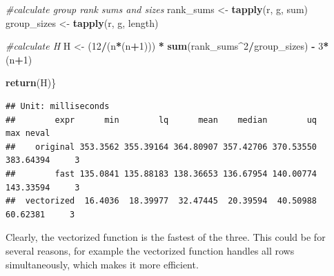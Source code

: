 \documentclass[
]{article}
\newenvironment{Shaded}{\begin{snugshade}}{\end{snugshade}}
\newcommand{\AttributeTok}[1]{\textcolor[rgb]{0.13,0.29,0.53}{#1}}
\newcommand{\CommentTok}[1]{\textcolor[rgb]{0.56,0.35,0.01}{\textit{#1}}}
\newcommand{\ControlFlowTok}[1]{\textcolor[rgb]{0.13,0.29,0.53}{\textbf{#1}}}
\newcommand{\DecValTok}[1]{\textcolor[rgb]{0.00,0.00,0.81}{#1}}
\newcommand{\FunctionTok}[1]{\textcolor[rgb]{0.13,0.29,0.53}{\textbf{#1}}}
\newcommand{\NormalTok}[1]{#1}
\newcommand{\OtherTok}[1]{\textcolor[rgb]{0.56,0.35,0.01}{#1}}
\newcommand{\SpecialCharTok}[1]{\textcolor[rgb]{0.81,0.36,0.00}{\textbf{#1}}}
\begin{document}
\begin{Shaded}
\begin{Highlighting}[]
  \CommentTok{\#calculate group rank sums and sizes}
\NormalTok{  rank\_sums }\OtherTok{\textless{}{-}} \FunctionTok{tapply}\NormalTok{(r, g, sum)}
\NormalTok{  group\_sizes }\OtherTok{\textless{}{-}} \FunctionTok{tapply}\NormalTok{(r, g, length)}

  \CommentTok{\#calculate H}
\NormalTok{  H }\OtherTok{\textless{}{-}}\NormalTok{ (}\DecValTok{12}\SpecialCharTok{/}\NormalTok{(n}\SpecialCharTok{*}\NormalTok{(n}\SpecialCharTok{+}\DecValTok{1}\NormalTok{))) }\SpecialCharTok{*} \FunctionTok{sum}\NormalTok{(rank\_sums}\SpecialCharTok{\^{}}\DecValTok{2}\SpecialCharTok{/}\NormalTok{group\_sizes) }\SpecialCharTok{{-}} \DecValTok{3}\SpecialCharTok{*}\NormalTok{(n}\SpecialCharTok{+}\DecValTok{1}\NormalTok{)}
  
  \FunctionTok{return}\NormalTok{(H)\}}
\end{Highlighting}
\end{Shaded}

\begin{Shaded}
\end{Shaded}

\begin{verbatim}
## Unit: milliseconds
##        expr      min        lq      mean    median        uq       max neval
##    original 353.3562 355.39164 364.80907 357.42706 370.53550 383.64394     3
##        fast 135.0841 135.88183 138.36653 136.67954 140.00774 143.33594     3
##  vectorized  16.4036  18.39977  32.47445  20.39594  40.50988  60.62381     3
\end{verbatim}

Clearly, the vectorized function is the fastest of the three. This could
be for several reasons, for example the vectorized function handles all
rows simultaneously, which makes it more efficient.
\end{document}
